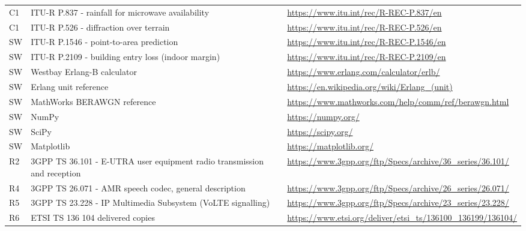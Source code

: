 \documentclass[9pt,a4paper]{extarticle}
\newcommand{\ulinkurl}[1]{#1}
\begin{document}
{\begin{longtable}{@{}p{0.65cm}p{4.4cm}p{9.7cm}@{}}
C1 & ITU-R P.837 - rainfall for microwave availability & \href{https://www.itu.int/rec/R-REC-P.837/en}{\ulinkurl{https://www.itu.int/rec/R-REC-P.837/en}} \\
C1 & ITU-R P.526 - diffraction over terrain & \href{https://www.itu.int/rec/R-REC-P.526/en}{\ulinkurl{https://www.itu.int/rec/R-REC-P.526/en}} \\
SW & ITU-R P.1546 - point-to-area prediction & \href{https://www.itu.int/rec/R-REC-P.1546/en}{\ulinkurl{https://www.itu.int/rec/R-REC-P.1546/en}} \\
SW & ITU-R P.2109 - building entry loss (indoor margin) & \href{https://www.itu.int/rec/R-REC-P.2109/en}{\ulinkurl{https://www.itu.int/rec/R-REC-P.2109/en}} \\
SW & Westbay Erlang-B calculator & \href{https://www.erlang.com/calculator/erlb/}{\ulinkurl{https://www.erlang.com/calculator/erlb/}} \\
SW & Erlang unit reference & \href{https://en.wikipedia.org/wiki/Erlang_(unit)}{\ulinkurl{https://en.wikipedia.org/wiki/Erlang\_(unit)}} \\
SW & MathWorks BERAWGN reference & \href{https://www.mathworks.com/help/comm/ref/berawgn.html}{\ulinkurl{https://www.mathworks.com/help/comm/ref/berawgn.html}} \\
SW & NumPy & \href{https://numpy.org/}{\ulinkurl{https://numpy.org/}} \\
SW & SciPy & \href{https://scipy.org/}{\ulinkurl{https://scipy.org/}} \\
SW & Matplotlib & \href{https://matplotlib.org/}{\ulinkurl{https://matplotlib.org/}} \\
R2 & 3GPP TS 36.101 - E-UTRA user equipment radio transmission and reception & \href{https://www.3gpp.org/ftp/Specs/archive/36_series/36.101/}{\ulinkurl{https://www.3gpp.org/ftp/Specs/archive/36\_series/36.101/}} \\
R4 & 3GPP TS 26.071 - AMR speech codec, general description & \href{https://www.3gpp.org/ftp/Specs/archive/26_series/26.071/}{\ulinkurl{https://www.3gpp.org/ftp/Specs/archive/26\_series/26.071/}} \\
R5 & 3GPP TS 23.228 - IP Multimedia Subsystem (VoLTE signalling) & \href{https://www.3gpp.org/ftp/Specs/archive/23_series/23.228/}{\ulinkurl{https://www.3gpp.org/ftp/Specs/archive/23\_series/23.228/}} \\
R6 & ETSI TS 136 104 delivered copies & \href{https://www.etsi.org/deliver/etsi_ts/136100_136199/136104/}{\ulinkurl{https://www.etsi.org/deliver/etsi\_ts/136100\_136199/136104/}} \\

\end{longtable}}
\end{document}
